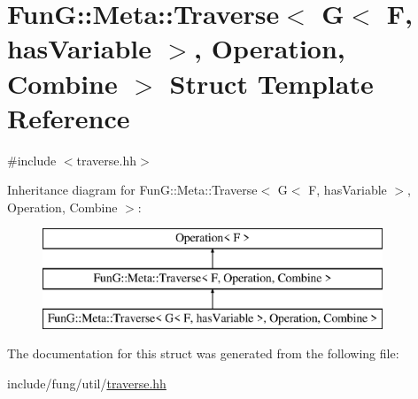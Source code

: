 \hypertarget{structFunG_1_1Meta_1_1Traverse_3_01G_3_01F_00_01hasVariable_01_4_00_01Operation_00_01Combine_01_4}{}\section{FunG\+:\+:Meta\+:\+:Traverse$<$ G$<$ F, has\+Variable $>$, Operation, Combine $>$ Struct Template Reference}
\label{structFunG_1_1Meta_1_1Traverse_3_01G_3_01F_00_01hasVariable_01_4_00_01Operation_00_01Combine_01_4}


{\ttfamily \#include $<$traverse.\+hh$>$}

Inheritance diagram for FunG\+:\+:Meta\+:\+:Traverse$<$ G$<$ F, has\+Variable $>$, Operation, Combine $>$\+:\begin{figure}[H]
\begin{center}
\leavevmode
\includegraphics[height=3.000000cm]{structFunG_1_1Meta_1_1Traverse_3_01G_3_01F_00_01hasVariable_01_4_00_01Operation_00_01Combine_01_4}
\end{center}
\end{figure}


The documentation for this struct was generated from the following file\+:\begin{DoxyCompactItemize}
\item 
include/fung/util/\hyperlink{traverse_8hh}{traverse.\+hh}\end{DoxyCompactItemize}
